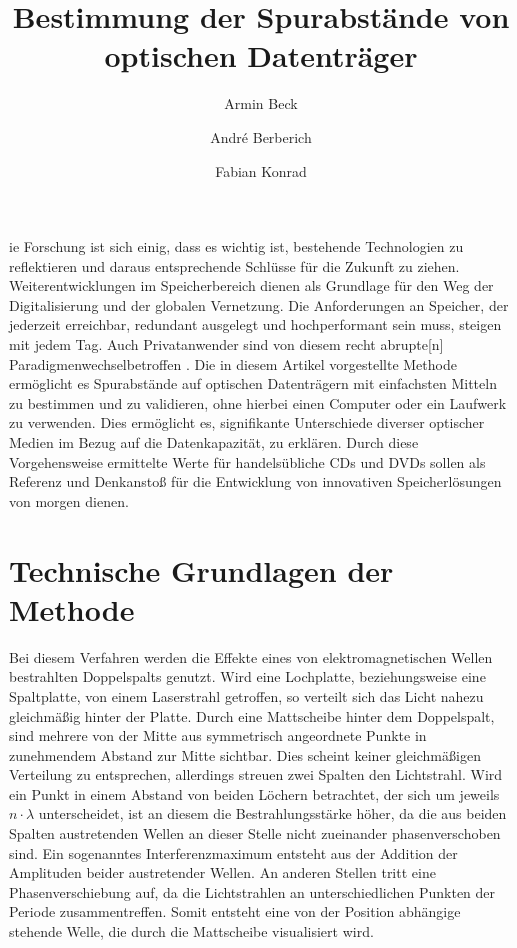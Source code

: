\documentclass[9pt,twocolumn,twoside]{pnas-new}
\title{Bestimmung der Spurabstände von optischen Datenträger}
\author[a]{Armin Beck}
\author[a]{André Berberich}
\author[a]{Fabian Konrad}
\affil[a]{Student der DHBW Mosbach}
\begin{document}
\verticaladjustment{-2pt}

\maketitle
\thispagestyle{firststyle}

ie Forschung ist sich einig, dass es wichtig ist, bestehende Technologien zu reflektieren und daraus entsprechende Schlüsse für die Zukunft zu ziehen. Weiterentwicklungen im Speicherbereich dienen als Grundlage für den Weg der Digitalisierung und der globalen Vernetzung. 
Die Anforderungen an Speicher, der jederzeit erreichbar, redundant ausgelegt und hochperformant sein muss, steigen mit jedem Tag.
Auch Privatanwender sind von diesem \glqq recht abrupte[n] Paradigmenwechsel\grqq \space betroffen \cite[Heft 10/2012 S.102]{CT1990}.
Die in diesem Artikel vorgestellte Methode ermöglicht es Spurabstände auf optischen Datenträgern mit einfachsten Mitteln zu bestimmen und zu validieren, ohne hierbei einen Computer oder ein Laufwerk zu verwenden. Dies ermöglicht es, signifikante Unterschiede diverser optischer Medien im Bezug auf die Datenkapazität, zu erklären. Durch diese Vorgehensweise ermittelte Werte für handelsübliche CDs und DVDs sollen als Referenz und Denkanstoß für die Entwicklung von innovativen Speicherlösungen von morgen dienen.

\section*{Technische Grundlagen der Methode}
Bei diesem Verfahren werden die Effekte eines von elektromagnetischen Wellen bestrahlten Doppelspalts genutzt.
 Wird eine Lochplatte, beziehungsweise eine Spaltplatte, von einem Laserstrahl getroffen, so verteilt sich das Licht nahezu gleichmäßig hinter der Platte.
 Durch eine Mattscheibe hinter dem Doppelspalt, sind mehrere von der Mitte aus symmetrisch angeordnete Punkte in zunehmendem Abstand zur Mitte sichtbar.
Dies scheint keiner gleichmäßigen Verteilung zu entsprechen, allerdings streuen zwei Spalten den Lichtstrahl.
Wird ein Punkt in einem Abstand von beiden Löchern betrachtet, der sich um jeweils \begin{math}n\cdot\lambda\end{math} unterscheidet, ist an diesem die Bestrahlungsstärke höher, da die aus beiden Spalten austretenden Wellen an dieser Stelle nicht zueinander phasenverschoben sind. Ein sogenanntes Interferenzmaximum entsteht aus der Addition der Amplituden beider austretender Wellen. An anderen Stellen tritt eine Phasenverschiebung auf, da die Lichtstrahlen an unterschiedlichen Punkten der Periode zusammentreffen. Somit entsteht eine von der Position abhängige stehende Welle, die durch die Mattscheibe visualisiert wird.
\end{document}

